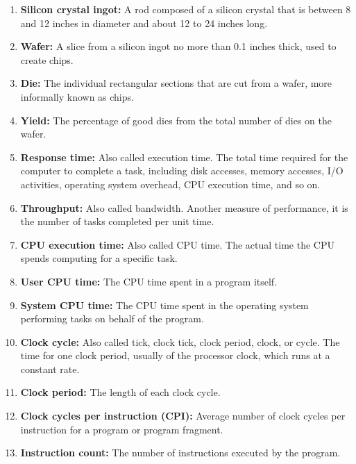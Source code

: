 \begin{enumerate}
    \item \textbf{Silicon crystal ingot:} A rod composed of a silicon crystal that is between 8 and 12 inches in diameter and about 12 to 24 inches long.
    
    \item \textbf{Wafer:} A slice from a silicon ingot no more than 0.1 inches thick, used to create chips.
    
    \item \textbf{Die:} The individual rectangular sections that are cut from a wafer, more informally known as chips.
    
    \item \textbf{Yield:} The percentage of good dies from the total number of dies on the wafer.
    
    \item \textbf{Response time:} Also called execution time. The total time required for the computer to complete a task, including disk accesses, memory accesses, I/O activities, operating system overhead, CPU execution time, and so on.
    
    \item \textbf{Throughput:} Also called bandwidth. Another measure of performance, it is the number of tasks completed per unit time.
    
    \item \textbf{CPU execution time:} Also called CPU time. The actual time the CPU spends computing for a specific task.
    
    \item \textbf{User CPU time:} The CPU time spent in a program itself.
    
    \item \textbf{System CPU time:} The CPU time spent in the operating system performing tasks on behalf of the program.
    
    \item \textbf{Clock cycle:} Also called tick, clock tick, clock period, clock, or cycle. The time for one clock period, usually of the processor clock, which runs at a constant rate.
    
    \item \textbf{Clock period:} The length of each clock cycle.
    
    \item \textbf{Clock cycles per instruction (CPI):} Average number of clock cycles per instruction for a program or program fragment.
    
    \item \textbf{Instruction count:} The number of instructions executed by the program.
    

\end{enumerate}
